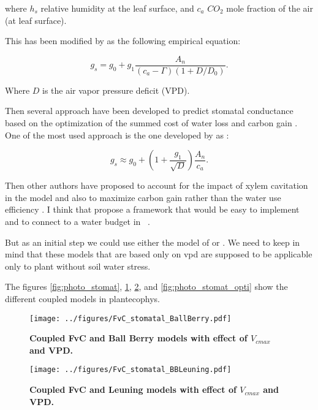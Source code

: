 \documentclass[a4paper,11pt]{article}
\begin{document}
where $h_s$ relative humidity at the leaf surface, and $c_a$ $CO_2$ mole fraction of the air (at leaf surface).

This has been modified by \citet{Leuning-1995} as the following empirical equation:

\begin{equation}
\label{eq:gs-Leuning}
g_s= g_0 + g_1 \frac{A_n }{(c_a - \Gamma)(1+D/D_0)}.
\end{equation}

Where $D$ is the air vapor pressure deficit (VPD).

Then several approach have been developed to predict stomatal conductance based on the optimization of the summed cost of water loss and carbon gain \citep{Medlyn-2002,Prentice-2014,Wolf-2016,Sperry-2017}. One of the most used approach is the one developed by \citet{Medlyn-2011} as :

\begin{equation}
\label{eq:gs-Medlyn}
g_s \approx g_0 + (1 + \frac{g_1}{\sqrt{D}}) \frac{A_n }{c_a}.
\end{equation}


Then other authors have proposed to account for the impact of xylem cavitation \citet{Wolf-2016,Sperry-2016,Sperry-2017} in the model and also to maximize carbon gain rather than the water use efficiency \citet{Wolf-2016}. I think that \citep{Sperry-2016} propose a framework that would be easy to implement and to connect to a water budget in \plant\ .

But as an initial step we could use either the model of \citet{Medlyn-2011} or \citet{Leuning-1995}. We need to keep in mind that these models that are based only on vpd are supposed to be applicable only to plant without soil water stress.

The figures \ref{fig:photo_stomat}, \ref{fig:photo_stomat_BB}, \ref{fig:photo_stomat_Leuning}, and \ref{fig:photo_stomat_opti} show the different coupled models in plantecophys.

\begin{figure}[ht]
\centering
\texttt{[image: ../figures/FvC\_stomatal\_BallBerry.pdf]}
\caption{\textbf{Coupled FvC and Ball Berry models with effect of $V_{cmax}$ and VPD.}
\label{fig:photo_stomat_BB}}
\end{figure}

\begin{figure}[ht]
\centering
\texttt{[image: ../figures/FvC\_stomatal\_BBLeuning.pdf]}
\caption{\textbf{Coupled FvC and Leuning models with effect of $V_{cmax}$ and VPD.}
\label{fig:photo_stomat_Leuning}}
\end{figure}
\end{document}
